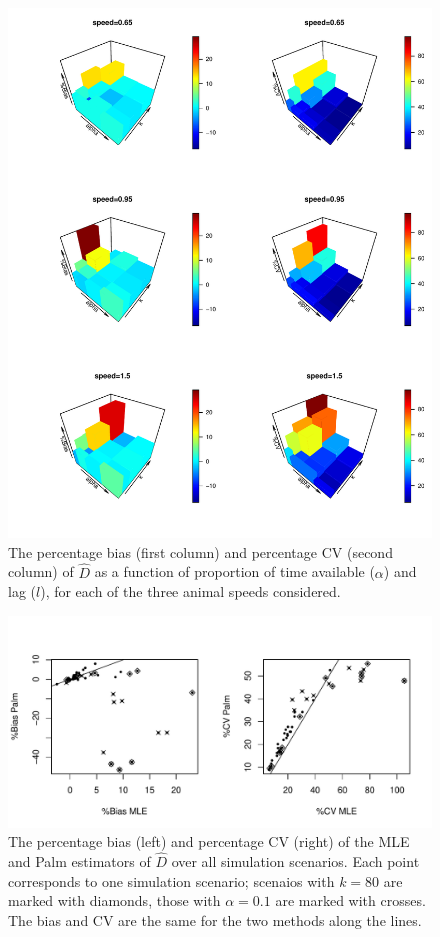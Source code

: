 \documentclass[useAMS, usenatbib, referee]{biom}\usepackage[]{graphicx}\usepackage[]{color}
\begin{document}
\begin{figure}
\includegraphics[width = \textwidth]{figs/biascv.pdf}
\caption{The percentage bias (first column) and percentage CV (second column) of $\hat{D}$ as a function of proportion of time available ($\alpha$) and lag ($l$), for each of the three animal speeds considered.}
\label{fig:biascv}
\end{figure}





\begin{figure}
\includegraphics[width = \textwidth]{figs/mlepalm.pdf}
\caption{The percentage bias (left) and percentage CV (right) of the MLE and Palm estimators of $\hat{D}$ over all simulation scenarios. Each point corresponds to one simulation scenario; scenaios with $k=80$ are marked with diamonds, those with $\alpha=0.1$ are marked with crosses. The bias and CV are the same for the two methods along the lines.}
\label{fig:mlepalm}
\end{figure}
\end{document}
